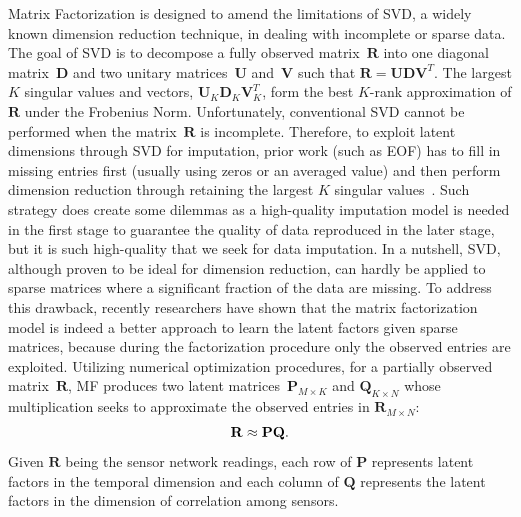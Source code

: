 Matrix Factorization is designed to amend the limitations of SVD, a widely known dimension reduction technique, 
in dealing with incomplete or sparse data.
The goal of SVD is to decompose a fully observed matrix~$\mathbf{R}$ into one diagonal matrix~$\mathbf{D}$ and two unitary matrices~$\mathbf{U}$ and~$\mathbf{V}$ such that
$\mathbf{R} = \mathbf{U}\mathbf{D}\mathbf{V}^T.$ %
The largest $K$ singular values and vectors, $\mathbf{U}_K \mathbf{D}_K \mathbf{V}_K^T$, form the best $K$-rank approximation of $\mathbf{R}$ under the Frobenius Norm. Unfortunately, conventional SVD cannot be performed when the matrix~$\mathbf{R}$ is incomplete. 
Therefore, to exploit latent dimensions through SVD for imputation, prior work (such as EOF) has to fill in missing entries first 
(usually using zeros or an averaged value) and then perform dimension reduction through retaining the largest $K$ singular values~\cite{beckers2003eof}. 
Such strategy does create some dilemmas as a high-quality imputation model is needed in the first stage to guarantee the quality of 
data reproduced in the later stage, but it is such high-quality that we seek for data imputation. In a nutshell, SVD, although 
proven to be ideal for dimension reduction, can hardly be applied to sparse matrices where a significant fraction of 
the data are missing.
To address this drawback, recently researchers have shown \cite{koren2009matrix} that the matrix factorization model is indeed 
a better approach to learn the latent factors given sparse matrices, because during the factorization procedure only the observed entries are exploited.
Utilizing numerical optimization procedures, for a partially observed matrix~$\mathbf{R}$, MF produces two latent 
matrices~$\mathbf{P}_{M \times K}$ and $\mathbf{Q}_{K \times N}$ whose multiplication seeks to approximate the observed entries in $\mathbf{R}_{M \times N}$:
\begin{equation*}\small \mathbf{R} \approx \mathbf{P} \mathbf{Q}.\end{equation*}
Given $\mathbf{R}$ being the sensor network readings, each row of $\mathbf{P}$ represents latent factors in the temporal dimension and each column of $\mathbf{Q}$ represents the latent factors in the dimension of correlation among sensors.

